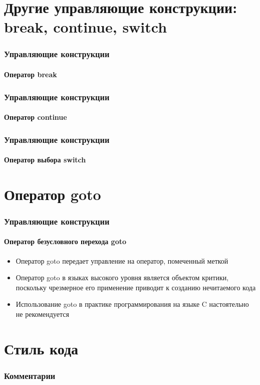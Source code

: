 \documentclass[12pt,pdf,hyperref={unicode}]{beamer}
\begin{document}
\section{Другие управляющие конструкции: break, continue, switch}

\begin{frame}
\frametitle{Управляющие конструкции} 
\framesubtitle{Оператор break}


\end{frame}

\begin{frame}
\frametitle{Управляющие конструкции} 
\framesubtitle{Оператор continue}


\end{frame}

\begin{frame}
\frametitle{Управляющие конструкции} 
\framesubtitle{Оператор выбора switch}


\end{frame}



\section{Оператор goto}


\begin{frame}
\frametitle{Управляющие конструкции} 
\framesubtitle{Оператор безусловного перехода goto}

\begin{itemize}
\item Оператор goto передает управление на оператор, помеченный меткой
\item Оператор goto в языках высокого уровня является объектом критики, поскольку чрезмерное его применение приводит к созданию нечитаемого кода
\item Использование goto в практике программирования на языке C настоятельно не рекомендуется
\end{itemize}


\end{frame}

\section{Стиль кода}


\begin{frame}
\frametitle{Комментарии}


\end{frame}
\end{document}
